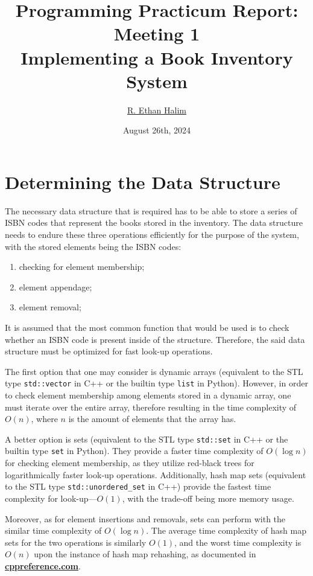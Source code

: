 \documentclass[12pt]{article}
\title{Programming Practicum Report: \\ Meeting 1 \\ Implementing a Book Inventory System}
\author{\href{https://github.com/avaxar}{R. Ethan Halim}}
\date{August 26th, 2024}
\begin{document}
\maketitle

\section{Determining the Data Structure}

The necessary data structure that is required has to be able to store a series of ISBN codes that represent the books stored in the inventory. The data structure needs to endure these three operations efficiently for the purpose of the system, with the stored elements being the ISBN codes:
\begin{enumerate}
    \item checking for element membership;
    \item element appendage;
    \item element removal;
\end{enumerate}
It is assumed that the most common function that would be used is to check whether an ISBN code is present inside of the structure. Therefore, the said data structure must be optimized for fast look-up operations.

The first option that one may consider is dynamic arrays (equivalent to the STL type \texttt{std::vector} in C++ or the builtin type \texttt{list} in Python). However, in order to check element membership among elements stored in a dynamic array, one must iterate over the entire array, therefore resulting in the time complexity of $O(n)$, where $n$ is the amount of elements that the array has.

A better option is sets (equivalent to the STL type \texttt{std::set} in C++ or the builtin type \texttt{set} in Python). They provide a faster time complexity of $O(\log n)$ for checking element membership, as they utilize red-black trees for logarithmically faster look-up operations. Additionally, hash map sets (equivalent to the STL type \texttt{std::unordered\_set} in C++) provide the fastest time complexity for look-up---$O(1)$, with the trade-off being more memory usage.

Moreover, as for element insertions and removals, sets can perform with the similar time complexity of $O(\log n)$. The average time complexity of hash map sets for the two operations is similarly $O(1)$, and the worst time complexity is $O(n)$ upon the instance of hash map rehashing, as documented in \href{https://en.cppreference.com/w/cpp/container/unordered_set/insert}{\textbf{cppreference.com}}.
\end{document}
